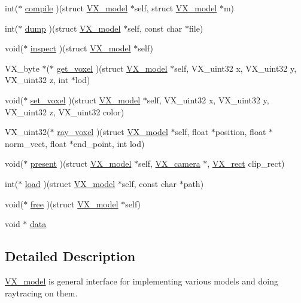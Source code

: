 \begin{DoxyCompactItemize}
\item 
int($\ast$ \hyperlink{structVX__model_affc69898370ac445fb57f55e262b07cb}{compile} )(struct \hyperlink{structVX__model}{V\-X\-\_\-model} $\ast$self, struct \hyperlink{structVX__model}{V\-X\-\_\-model} $\ast$m)
\item 
int($\ast$ \hyperlink{structVX__model_a79f230b8c7c5c863f047d9465e662a56}{dump} )(struct \hyperlink{structVX__model}{V\-X\-\_\-model} $\ast$self, const char $\ast$file)
\item 
void($\ast$ \hyperlink{structVX__model_a364592c8e3e50b10c2ac20c269b21e9e}{inspect} )(struct \hyperlink{structVX__model}{V\-X\-\_\-model} $\ast$self)
\item 
V\-X\-\_\-byte $\ast$($\ast$ \hyperlink{structVX__model_a377285d816fc87e24f91c77fc4a96a72}{get\-\_\-voxel} )(struct \hyperlink{structVX__model}{V\-X\-\_\-model} $\ast$self, V\-X\-\_\-uint32 x, V\-X\-\_\-uint32 y, V\-X\-\_\-uint32 z, int $\ast$lod)
\item 
void($\ast$ \hyperlink{structVX__model_a23152a65b6fe9706f0739bd69935206a}{set\-\_\-voxel} )(struct \hyperlink{structVX__model}{V\-X\-\_\-model} $\ast$self, V\-X\-\_\-uint32 x, V\-X\-\_\-uint32 y, V\-X\-\_\-uint32 z, V\-X\-\_\-uint32 color)
\item 
V\-X\-\_\-uint32($\ast$ \hyperlink{structVX__model_a38625f06da2593c36f9ba092ae07cfd0}{ray\-\_\-voxel} )(struct \hyperlink{structVX__model}{V\-X\-\_\-model} $\ast$self, float $\ast$position, float $\ast$norm\-\_\-vect, float $\ast$end\-\_\-point, int lod)
\item 
void($\ast$ \hyperlink{structVX__model_a92ba0d38f0ec8ee593c242e9de7c5d07}{present} )(struct \hyperlink{structVX__model}{V\-X\-\_\-model} $\ast$self, \hyperlink{structVX__camera}{V\-X\-\_\-camera} $\ast$, \hyperlink{structVX__rect}{V\-X\-\_\-rect} clip\-\_\-rect)
\item 
int($\ast$ \hyperlink{structVX__model_ab7d7fcf8ad77630cce9a33ba2d34fc79}{load} )(struct \hyperlink{structVX__model}{V\-X\-\_\-model} $\ast$self, const char $\ast$path)
\item 
void($\ast$ \hyperlink{structVX__model_a2edb2c0e903ae5422f19640d14550614}{free} )(struct \hyperlink{structVX__model}{V\-X\-\_\-model} $\ast$self)
\item 
void $\ast$ \hyperlink{structVX__model_a6caa79e92123cf10b93b19201849a024}{data}
\end{DoxyCompactItemize}


\subsection{Detailed Description}
\hyperlink{structVX__model}{V\-X\-\_\-model} is general interface for implementing various models and doing raytracing on them. 

